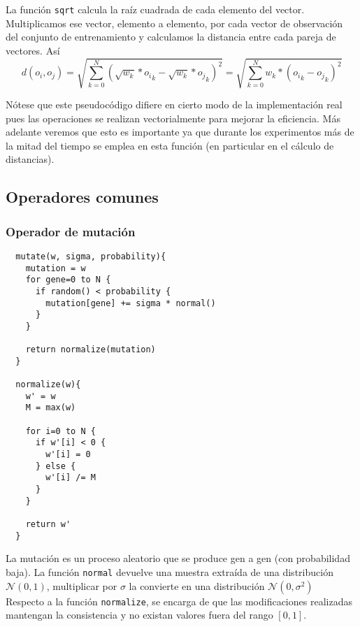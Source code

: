 \documentclass[11pt]{article}
\theoremstyle{plain}
\theoremstyle{definition}
\begin{document}
La función \texttt{sqrt} calcula la raíz cuadrada de cada elemento del
vector. Multiplicamos ese vector, elemento a elemento, por cada vector
de observación del conjunto de entrenamiento y calculamos la distancia
entre cada pareja de vectores. Así \\

$$ d(o_i, o_j) = \sqrt{\sum_{k=0}^N (\sqrt{w_k} * {o_i}_k -
  \sqrt{w_k} * {o_j}_k)^2} = \sqrt{\sum_{k=0}^N w_k * ({o_i}_k -
  {o_j}_k)^2} $$

Nótese que este pseudocódigo difiere en cierto modo de la
implementación real pues las operaciones se realizan vectorialmente
para mejorar la eficiencia. Más adelante veremos que esto es
importante ya que durante los experimentos más de la mitad del tiempo
se emplea en esta función (en particular en el cálculo de distancias). \\

\subsection{Operadores comunes}
\subsubsection{Operador de mutación}

\begin{lstlisting}
  mutate(w, sigma, probability){
    mutation = w
    for gene=0 to N {
      if random() < probability {
        mutation[gene] += sigma * normal()
      }
    }

    return normalize(mutation)
  }

  normalize(w){
    w' = w
    M = max(w)

    for i=0 to N {
      if w'[i] < 0 {
        w'[i] = 0
      } else {
        w'[i] /= M
      }
    }

    return w'
  }
\end{lstlisting}

La mutación es un proceso aleatorio que se produce gen a gen (con probabilidad baja). La función \texttt{normal} devuelve
una muestra extraída de una distribución $\mathcal{N}(0,
1)$, multiplicar por $\sigma$ la convierte en una distribución
$\mathcal{N}(0, \sigma^2)$ \\

Respecto a la función \texttt{normalize}, se
encarga de que las modificaciones realizadas mantengan la consistencia
y no existan valores fuera del rango $[0, 1]$. \\
\end{document}
